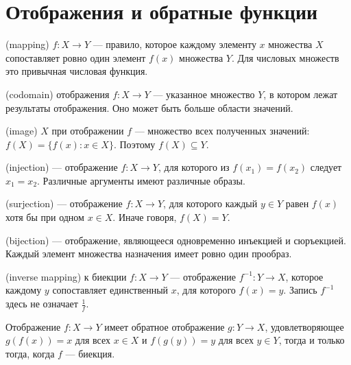 \section{Отображения и обратные функции}
\begin{definition} (mapping) \(f:X\to Y\) — правило, которое каждому элементу \(x\) множества \(X\) сопоставляет ровно один элемент \(f(x)\) множества \(Y\). Для числовых множеств это привычная числовая функция.\end{definition}
\begin{definition} (codomain) отображения \(f:X\to Y\) — указанное множество \(Y\), в котором лежат результаты отображения. Оно может быть больше области значений.\end{definition}
\begin{definition} (image) \(X\) при отображении \(f\) — множество всех полученных значений: \(f(X)=\{f(x):x\in X\}\). Поэтому \(f(X)\subseteq Y\).\end{definition}
\begin{definition} (injection) — отображение \(f:X\to Y\), для которого из \(f(x_1)=f(x_2)\) следует \(x_1=x_2\). Различные аргументы имеют различные образы.\end{definition}
\begin{definition} (surjection) — отображение \(f:X\to Y\), для которого каждый \(y\in Y\) равен \(f(x)\) хотя бы при одном \(x\in X\). Иначе говоря, \(f(X)=Y\).\end{definition}
\begin{definition} (bijection) — отображение, являющееся одновременно инъекцией и сюръекцией. Каждый элемент множества назначения имеет ровно один прообраз.\end{definition}
\begin{definition} (inverse mapping) к биекции \(f:X\to Y\) — отображение \(f^{-1}:Y\to X\), которое каждому \(y\) сопоставляет единственный \(x\), для которого \(f(x)=y\). Запись \(f^{-1}\) здесь не означает \(\frac{1}{f}\).\end{definition}
\begin{theorem}\label{thm:legacy-c13-1}
Отображение \(f:X\to Y\) имеет обратное отображение \(g:Y\to X\), удовлетворяющее \(g(f(x))=x\) для всех \(x\in X\) и \(f(g(y))=y\) для всех \(y\in Y\), тогда и только тогда, когда \(f\) — биекция.
\end{theorem}
